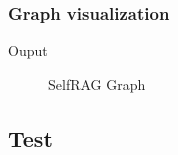 \documentclass[letterpaper,11pt,english]{sphinxmanual}
\begin{document}
\subsubsection{Graph visualization}
\label{\detokenize{rag:graph-visualization}}
\begin{sphinxVerbatim}[commandchars=\\\{\}]
    

\end{sphinxVerbatim}

\sphinxAtStartPar
Ouput

\begin{figure}[htbp]
\centering
\capstart

\noindent{}
\caption{Self\sphinxhyphen{}RAG Graph}\label{\detokenize{rag:id59}}\label{\detokenize{rag:fig-self-rag-graph}}\end{figure}


\subsection{Test}
\label{\detokenize{rag:test}}
\end{document}
